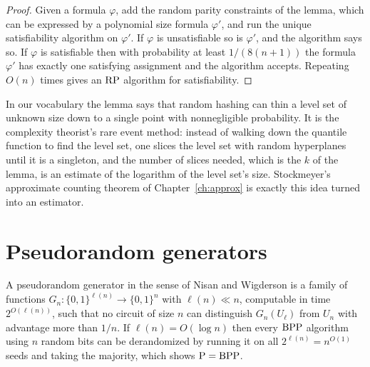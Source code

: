 \begin{proof}
Given a formula $\varphi$, add the random parity constraints of the lemma, which can be expressed by a polynomial size formula $\varphi'$, and run the unique satisfiability algorithm on $\varphi'$. If $\varphi$ is unsatisfiable so is $\varphi'$, and the algorithm says so. If $\varphi$ is satisfiable then with probability at least $1/(8(n+1))$ the formula $\varphi'$ has exactly one satisfying assignment and the algorithm accepts. Repeating $O(n)$ times gives an $\mathrm{RP}$ algorithm for satisfiability.
\end{proof}

In our vocabulary the lemma says that random hashing can thin a level set of unknown size down to a single point with nonnegligible probability. It is the complexity theorist's rare event method: instead of walking down the quantile function to find the level set, one slices the level set with random hyperplanes until it is a singleton, and the number of slices needed, which is the $k$ of the lemma, is an estimate of the logarithm of the level set's size. Stockmeyer's approximate counting theorem of Chapter~\ref{ch:approx} is exactly this idea turned into an estimator.

\section{Pseudorandom generators}

A pseudorandom generator in the sense of Nisan and Wigderson is a family of functions $G_n : \{0,1\}^{\ell(n)} \to \{0,1\}^n$ with $\ell(n) \ll n$, computable in time $2^{O(\ell(n))}$, such that no circuit of size $n$ can distinguish $G_n(U_\ell)$ from $U_n$ with advantage more than $1/n$. If $\ell(n) = O(\log n)$ then every $\mathrm{BPP}$ algorithm using $n$ random bits can be derandomized by running it on all $2^{\ell(n)} = n^{O(1)}$ seeds and taking the majority, which shows $\mathrm{P} = \mathrm{BPP}$.

